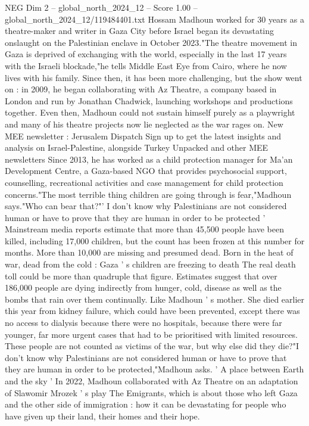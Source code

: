 \begin{textsample}{NEG Dim 2 – global\_north\_2024\_12 – Score 1.00 – global\_north\_2024\_12/119484401.txt}  \label{ex:f2_neg_167}
Hossam Madhoun worked for 30 years as a theatre-maker and writer in Gaza City before Israel began its devastating onslaught on the Palestinian enclave in October 2023."The theatre movement in Gaza is deprived of exchanging with the world, especially in the last 17 years with the Israeli blockade,"he tells Middle East Eye from Cairo, where he now lives with his family.
Since then, it has been more challenging, but the show went on : in 2009, he began collaborating with Az Theatre, a company based in London and run by Jonathan Chadwick, launching workshops and productions together.
Even then, Madhoun could not sustain himself purely as a playwright and many of his theatre projects now lie neglected as the war rages on.
New MEE newsletter : Jerusalem Dispatch Sign up to get the latest insights and analysis on Israel-Palestine, alongside Turkey Unpacked and other MEE newsletters Since 2013, he has worked as a child protection manager for Ma'an Development Centre, a Gaza-based NGO that provides psychosocial support, counselling, recreational activities and case management for child protection concerns."The most terrible thing children are going through is fear,"Madhoun says."Who can bear that?"' I don't know why Palestinians are not considered human or have to prove that they are human in order to be protected ' Mainstream media reports estimate that more than 45,500 people have been killed, including 17,000 children, but the count has been frozen at this number for months.
More than 10,000 are missing and presumed dead.
Born in the heat of war, dead from the cold : Gaza ' s children are freezing to death The real death toll could be more than quadruple that figure.
Estimates suggest that over 186,000 people are dying indirectly from hunger, cold, disease as well as the bombs that rain over them continually.
Like Madhoun ' s mother.
She died earlier this year from kidney failure, which could have been prevented, except there was no access to dialysis because there were no hospitals, because there were far younger, far more urgent cases that had to be prioritised with limited resources.
These people are not counted as victims of the war, but why else did they die?"I don't know why Palestinians are not considered human or have to prove that they are human in order to be protected,"Madhoun asks. ' A place between Earth and the sky ' In 2022, Madhoun collaborated with Az Theatre on an adaptation of Slawomir Mrozek ' s play The Emigrants, which is about those who left Gaza and the other side of immigration : how it can be devastating for people who have given up their land, their homes and their hope.

\end{textsample}
